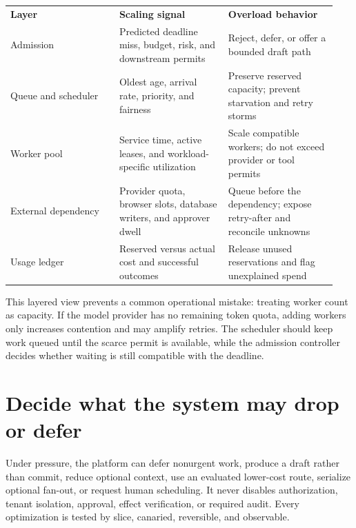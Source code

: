 \BookTableStart
\small
\begin{tabular}{@{}Y{0.3133\linewidth}Y{0.3133\linewidth}Y{0.3133\linewidth}@{}}
\color{white}\bfseries \textbf{Layer} & \color{white}\bfseries \textbf{Scaling signal} & \color{white}\bfseries \textbf{Overload behavior} \\
Admission & Predicted deadline miss, budget, risk, and downstream permits & Reject, defer, or offer a bounded draft path \\
Queue and scheduler & Oldest age, arrival rate, priority, and fairness & Preserve reserved capacity; prevent starvation and retry storms \\
Worker pool & Service time, active leases, and workload-specific utilization & Scale compatible workers; do not exceed provider or tool permits \\
External dependency & Provider quota, browser slots, database writers, and approver dwell & Queue before the dependency; expose retry-after and reconcile unknowns \\
Usage ledger & Reserved versus actual cost and successful outcomes & Release unused reservations and flag unexplained spend \\
\end{tabular}
\BookTableEnd

This layered view prevents a common operational mistake: treating worker count as capacity. If the model provider has no remaining token quota, adding workers only increases contention and may amplify retries. The scheduler should keep work queued until the scarce permit is available, while the admission controller decides whether waiting is still compatible with the deadline.\par

\section{Decide what the system may drop or defer}

Under pressure, the platform can defer nonurgent work, produce a draft rather than commit, reduce optional context, use an evaluated lower-cost route, serialize optional fan-out, or request human scheduling. It never disables authorization, tenant isolation, approval, effect verification, or required audit. Every optimization is tested by slice, canaried, reversible, and observable.\par

